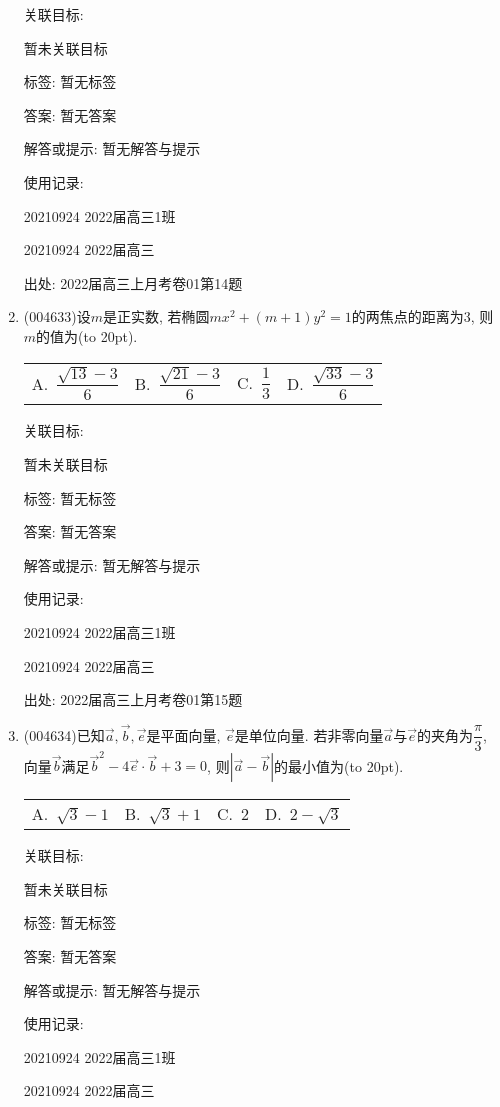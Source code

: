 \documentclass[10pt,a4paper]{article}
\newcommand{\bracket}[1]{(\hbox to #1pt{})}
\newcommand{\fourch}[4]{\par\begin{tabular}{p{.23\textwidth}p{.23\textwidth}p{.23\textwidth}p{.23\textwidth}}
A.~#1 &B.~#2& C.~#3& D.~#4
\end{tabular}}
\begin{document}
\begin{enumerate}[1.]
关联目标:

暂未关联目标



标签: 暂无标签

答案: 暂无答案

解答或提示: 暂无解答与提示

使用记录:

20210924	2022届高三1班	

20210924	2022届高三	


出处: 2022届高三上月考卷01第14题
\item { (004633)}设$m$是正实数, 若椭圆$mx^2+(m+1)y^2=1$的两焦点的距离为$3$, 则$m$的值为\bracket{20}.
\fourch{$\dfrac{\sqrt{13}-3}6$}{$\dfrac{\sqrt{21}-3}6$}{$\dfrac 13$}{$\dfrac{\sqrt{33}-3}6$}


关联目标:

暂未关联目标



标签: 暂无标签

答案: 暂无答案

解答或提示: 暂无解答与提示

使用记录:

20210924	2022届高三1班	

20210924	2022届高三	


出处: 2022届高三上月考卷01第15题
\item { (004634)}已知$\overrightarrow a,\overrightarrow b,\overrightarrow e$是平面向量, $\overrightarrow e$是单位向量. 若非零向量$\overrightarrow a$与$\overrightarrow e$的夹角为$\dfrac{\pi}3$, 向量$\overrightarrow b$满足$\overrightarrow b^2-4\overrightarrow e\cdot \overrightarrow b+3=0$, 则$|\overrightarrow a-\overrightarrow b|$的最小值为\bracket{20}.
\fourch{$\sqrt 3-1$}{$\sqrt 3+1$}{$2$}{$2-\sqrt 3$}


关联目标:

暂未关联目标



标签: 暂无标签

答案: 暂无答案

解答或提示: 暂无解答与提示

使用记录:

20210924	2022届高三1班	

20210924	2022届高三	



\end{enumerate}
\end{document}

